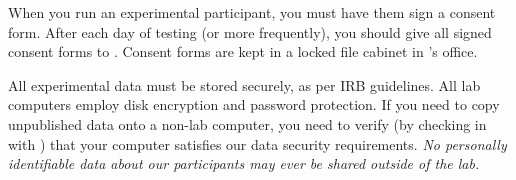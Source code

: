 \documentclass{tufte-book} %
\begin{document}
   
\noindent
   When you run an experimental participant, you must have them sign a
   consent form.  After each day of testing (or more frequently), you
   should give all signed consent forms to \coordinator.  Consent
   forms are kept in a locked file cabinet in \director's office.

   All experimental data must be stored securely, as per IRB
   guidelines.  All lab computers employ disk encryption and password
   protection.  If you need to copy unpublished data onto a non-lab
   computer, you need to verify (by checking in with \director) that
   your computer satisfies our data security requirements.  \textit{No
     personally identifiable data about our participants may ever be
     shared outside of the lab.}
\end{document}
